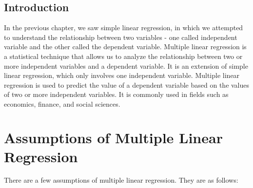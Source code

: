 \documentclass[
  letterpaper,
  paper =a4,
  twoside,
  openright,
  headsepline,
  footsepline,
  listof = totocnumbered,
  chapterprefix = true,
  firstiscover,
  parskip = full*]{scrbook}
\begin{document}
\subsection{Introduction}\label{introduction-2}

In the previous chapter, we saw simple linear regression, in which we
attempted to understand the relationship between two variables - one
called independent variable and the other called the dependent variable.
Multiple linear regression is a statistical technique that allows us to
analyze the relationship between two or more independent variables and a
dependent variable. It is an extension of simple linear regression,
which only involves one independent variable. Multiple linear regression
is used to predict the value of a dependent variable based on the values
of two or more independent variables. It is commonly used in fields such
as economics, finance, and social sciences.

\section{Assumptions of Multiple Linear
Regression}\label{assumptions-of-multiple-linear-regression}

There are a few assumptions of multiple linear regression. They are as
follows:
\end{document}
